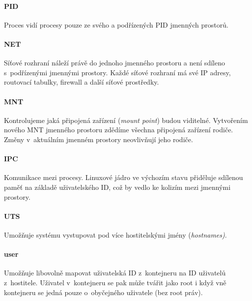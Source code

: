\paragraph{PID}

Proces vidí procesy pouze ze svého a podřízených PID jmenných prostorů.
\cite{pid_namespaces}

\paragraph{NET}

Síťové rozhraní náleží právě do jednoho jmenného prostoru a není sdíleno s~podřízenými jmennými prostory.
Každé síťové rozhraní má své IP adresy, routovací tabulky, firewall a další síťové prostředky. 
\cite{namespaces}

\paragraph{MNT}

Kontrolujeme jaká připojená zařízení (\textit{mount point}) budou viditelné.
Vytvořením nového MNT jmenného prostoru zdědíme všechna připojená zařízení rodiče.
Změny v~aktuálním jmenném prostory neovlivňují jeho rodiče.
\cite{mnt_namespaces}

\paragraph{IPC}

Komunikace mezi procesy.
Linuxové jádro ve výchozím stavu přiděluje sdílenou paměť na základě uživatelského ID, což by vedlo ke kolizím mezi jmennými prostory.
\cite{namespaces}

\paragraph{UTS}

Umožňuje systému vystupovat pod více hostitelskými jmény (\textit{hostnames)}.
\cite{namespaces}

\paragraph{user}

Umožňuje libovolně mapovat uživatelská ID z~kontejneru na ID uživatelů z~hostitele.
Uživatel v~kontejneru se pak může tvářit jako root i když vně kontejneru se jedná pouze o~obyčejného uživatele (bez root práv).
\cite{user_namespaces}

